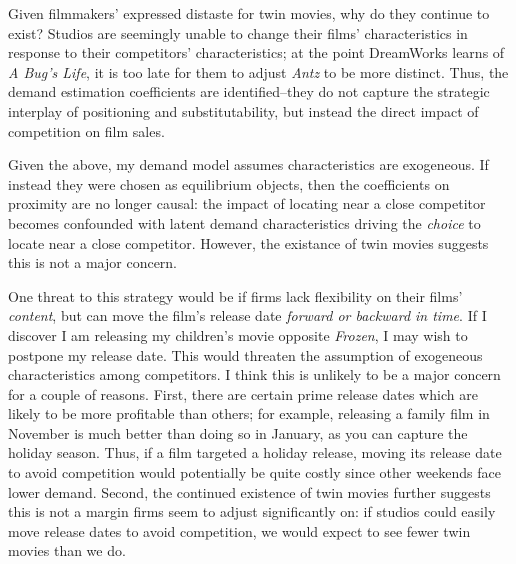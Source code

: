 \documentclass{article}
\begin{document}
Given filmmakers' expressed distaste for twin movies, why do they continue to exist? Studios are seemingly unable to change their films' characteristics in response to their competitors' characteristics; at the point DreamWorks learns of \emph{A Bug's Life}, it is too late for them to adjust \emph{Antz} to be more distinct. Thus, the demand estimation coefficients are identified--they do not capture the strategic interplay of positioning and substitutability, but instead the direct impact of competition on film sales.

Given the above, my demand model assumes characteristics are exogeneous. If instead they were chosen as equilibrium objects, then the coefficients on proximity are no longer causal: the impact of locating near a close competitor becomes confounded with latent demand characteristics driving the \emph{choice} to locate near a close competitor. However, the existance of twin movies suggests this is not a major concern.




One threat to this strategy would be if firms lack flexibility on their films' \emph{content}, but can move the film's release date \emph{forward or backward in time}. If I discover I am releasing my children's movie opposite \emph{Frozen}, I may wish to postpone my release date. This would threaten the assumption of exogeneous characteristics among competitors. I think this is unlikely to be a major concern for a couple of reasons. First, there are certain prime release dates which are likely to be more profitable than others; for example, releasing a family film in November is much better than doing so in January, as you can capture the holiday season. Thus, if a film targeted a holiday release, moving its release date to avoid competition would potentially be quite costly since other weekends face lower demand. Second, the continued existence of twin movies further suggests this is not a margin firms seem to adjust significantly on: if studios could easily move release dates to avoid competition, we would expect to see fewer twin movies than we do. 
\end{document}
